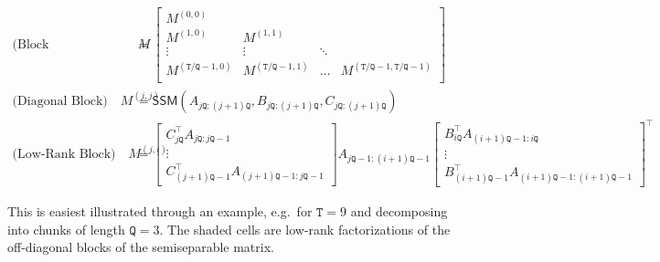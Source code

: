 \begin{align*}
  \text{(Block Decomposition)} \quad M &=
  \begin{bmatrix}
    M^{(0,0)} \\
    M^{(1,0)} & M^{(1,1)} \\
    \vdots & \vdots & \ddots \\
    M^{(\mathtt{T}/\mathtt{Q}-1,0)} & M^{(\mathtt{T}/\mathtt{Q}-1,1)} & \dots & M^{(\mathtt{T}/\mathtt{Q}-1,\mathtt{T}/\mathtt{Q}-1)} \\
  \end{bmatrix}
  \\
  \text{(Diagonal Block)} \quad M^{(j,j)} &= \mathsf{SSM}(A_{j\mathtt{Q}:(j+1)\mathtt{Q}}, B_{j\mathtt{Q}:(j+1)\mathtt{Q}}, C_{j\mathtt{Q}:(j+1)\mathtt{Q}}) \\
  \text{(Low-Rank Block)} \quad M^{(j,i)} &= 
  \begin{bmatrix}C_{j\mathtt{Q}}^{\top} A_{j\mathtt{Q}:j\mathtt{Q}-1} \\[1pt] \vdots \\[1pt] C_{(j+1)\mathtt{Q}-1}^{\top} A_{(j+1)\mathtt{Q}-1:j\mathtt{Q}-1}\end{bmatrix}
  A_{j\mathtt{Q}-1:(i+1)\mathtt{Q}-1}
  \begin{bmatrix}B_{i\mathtt{Q}}^{\top} A_{(i+1)\mathtt{Q}-1:i\mathtt{Q}} \\[1pt] \vdots \\[1pt] B_{(i+1)\mathtt{Q}-1}^{\top} A_{(i+1)\mathtt{Q}-1:(i+1)\mathtt{Q}-1}\end{bmatrix}^{\top}
\end{align*}

This is easiest illustrated through an example, e.g.\ for $\mathtt{T}=9$ and decomposing into chunks of length $\mathtt{Q}=3$.
The shaded cells are low-rank factorizations of the off-diagonal blocks of the semiseparable matrix.

